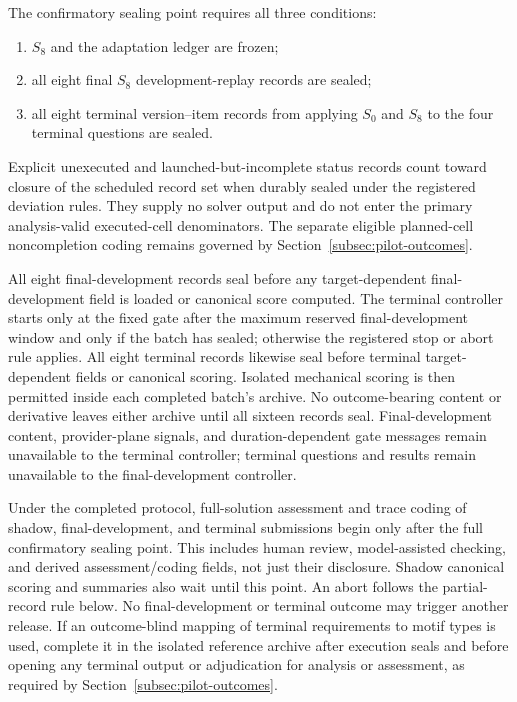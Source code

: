 \documentclass[10pt]{article} %
\providecommand{\1}{\mathbf{1}}  %
\theoremstyle{remark}
\theoremstyle{definition}
\begin{document}
The confirmatory sealing point requires all three conditions:
\begin{enumerate}[leftmargin=*,itemsep=2pt,topsep=2pt]
    \item $S_8$ and the adaptation ledger are frozen;
    \item all eight final $S_8$ development-replay records are sealed;
    \item all eight terminal version--item records from applying
    $S_0$ and $S_8$ to the four terminal questions are sealed.
\end{enumerate}
Explicit unexecuted and launched-but-incomplete status records count
toward closure of the scheduled record set when durably sealed under
the registered deviation rules. They supply no solver output and do
not enter the primary analysis-valid executed-cell denominators.
The separate eligible planned-cell noncompletion coding remains
governed by Section~\ref{subsec:pilot-outcomes}.

All eight final-development records seal before any target-dependent
final-development field is loaded or canonical score computed. The terminal
controller starts only at the fixed gate after the maximum reserved
final-development window and only if the batch has sealed; otherwise the
registered stop or abort rule applies. All eight terminal records likewise
seal before terminal target-dependent fields or canonical scoring. Isolated
mechanical scoring is then permitted inside each completed batch's archive.
No outcome-bearing content or derivative leaves either archive until all
sixteen records seal. Final-development content, provider-plane signals,
and duration-dependent gate messages remain unavailable to the terminal
controller; terminal questions and results remain unavailable to the
final-development controller.

Under the completed protocol, full-solution assessment and trace coding of
shadow, final-development, and terminal submissions begin only after the full
confirmatory sealing point. This includes human review, model-assisted
checking, and derived assessment/coding fields, not just their disclosure.
Shadow canonical scoring and summaries also wait until this point. An abort
follows the partial-record rule below. No final-development or terminal
outcome may trigger another release. If an outcome-blind mapping of terminal
requirements to motif types is used, complete it in the isolated reference
archive after execution seals and before opening any terminal output or
adjudication for analysis or assessment, as required by
Section~\ref{subsec:pilot-outcomes}.
\end{document}
